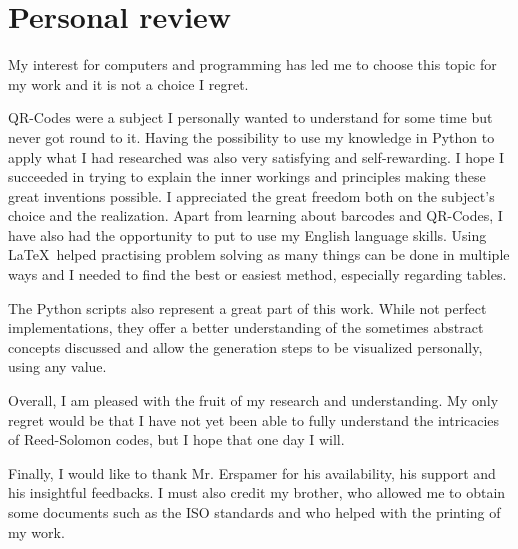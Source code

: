 \chapter{Personal review}
\label{chap:review}

My interest for computers and programming has led me to choose this topic for my work and it is not a choice I regret.

QR-Codes were a subject I personally wanted to understand for some time but never got round to it. Having the possibility to use my knowledge in Python to apply what I had researched was also very satisfying and self-rewarding. I hope I succeeded in trying to explain the inner workings and principles making these great inventions possible. I appreciated the great freedom both on the subject's choice and the realization. Apart from learning about barcodes and QR-Codes, I have also had the opportunity to put to use my English language skills.
Using \LaTeX\  helped practising problem solving as many things can be done in multiple ways and I needed to find the best or easiest method, especially regarding tables.

The Python scripts also represent a great part of this work. While not perfect implementations, they offer a better understanding of the sometimes abstract concepts discussed and allow the generation steps to be visualized personally, using any value.

Overall, I am pleased with the fruit of my research and understanding. My only regret would be that I have not yet been able to fully understand the intricacies of Reed-Solomon codes, but I hope that one day I will.

Finally, I would like to thank Mr. Erspamer for his availability, his support and his insightful feedbacks. I must also credit my brother, who allowed me to obtain some documents such as the ISO standards\cite{ISO16388}\cite{ISO18004} and who helped with the printing of my work.
